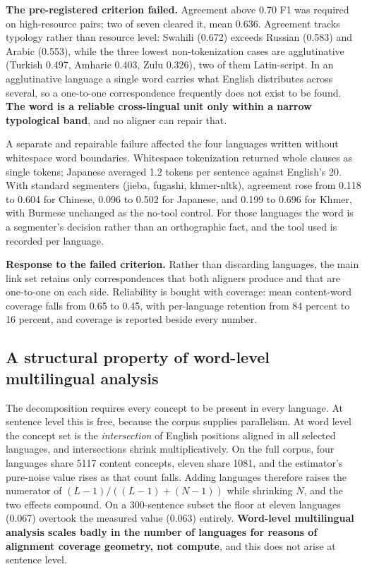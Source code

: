 \documentclass[11pt,a4paper]{article}
\begin{document}
\textbf{The pre-registered criterion failed.} Agreement above 0.70 F1 was
required on high-resource pairs; two of seven cleared it, mean 0.636.
Agreement tracks typology rather than resource level: Swahili (0.672)
exceeds Russian (0.583) and Arabic (0.553), while the three lowest
non-tokenization cases are agglutinative (Turkish 0.497, Amharic 0.403,
Zulu 0.326), two of them Latin-script. In an agglutinative language a single
word carries what English distributes across several, so a one-to-one
correspondence frequently does not exist to be found. \textbf{The word is a
reliable cross-lingual unit only within a narrow typological band}, and no
aligner can repair that.

A separate and repairable failure affected the four languages written
without whitespace word boundaries. Whitespace tokenization returned whole
clauses as single tokens; Japanese averaged 1.2 tokens per sentence against
English's 20. With standard segmenters (jieba, fugashi, khmer-nltk),
agreement rose from 0.118 to 0.604 for Chinese, 0.096 to 0.502 for Japanese,
and 0.199 to 0.696 for Khmer, with Burmese unchanged as the no-tool control.
For those languages the word is a segmenter's decision rather than an
orthographic fact, and the tool used is recorded per language.

\textbf{Response to the failed criterion.} Rather than discarding languages, the
main link set retains only correspondences that both aligners produce
and that are one-to-one on each side. Reliability is bought with coverage:
mean content-word coverage falls from 0.65 to 0.45, with per-language
retention from 84 percent to 16 percent, and coverage is reported beside
every number.

\subsection{A structural property of word-level multilingual analysis}
The decomposition requires every concept to be present in every language. At
sentence level this is free, because the corpus supplies parallelism. At
word level the concept set is the \emph{intersection} of English positions
aligned in all selected languages, and intersections shrink
multiplicatively. On the full corpus, four languages share 5117 content
concepts, eleven share 1081, and the estimator's pure-noise value rises as
that count falls. Adding languages therefore raises the numerator of
$(L-1)/((L-1)+(N-1))$ while shrinking $N$, and the two effects compound. On
a 300-sentence subset the floor at eleven languages (0.067) overtook the
measured value (0.063) entirely. \textbf{Word-level multilingual analysis
scales badly in the number of languages for reasons of alignment coverage
geometry, not compute}, and this does not arise at sentence level.
\end{document}
